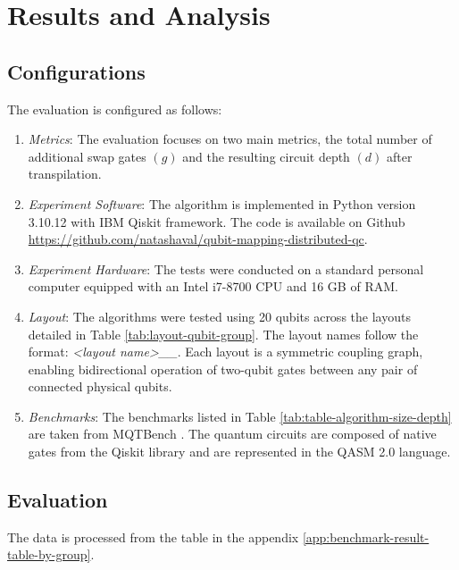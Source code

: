 \chapter{Results and Analysis} \label{Chap4}
\section{Configurations} %
The evaluation is configured as follows:
\begin{enumerate}[nolistsep]
    \item \textit{Metrics}: The evaluation focuses on two main metrics, the total number of additional swap gates $(g)$ and the resulting circuit depth $(d)$ after transpilation.
    \item \textit{Experiment Software}: The algorithm is implemented in Python version 3.10.12 with IBM Qiskit framework. The code is available on Github \url{https://github.com/natashaval/qubit-mapping-distributed-qc}.
    \item \textit{Experiment Hardware}: The tests were conducted on a standard personal computer equipped with an Intel i7-8700 CPU and 16 GB of RAM.
    \item \textit{Layout}: The algorithms were tested using 20 qubits across the layouts detailed in Table  \ref{tab:layout-qubit-group}. The layout names follow the format: \textit{<layout name>\_<number of qubits>\_<number of group>}. Each layout is a symmetric coupling graph, enabling bidirectional operation of two-qubit gates between any pair of connected physical qubits.
        
    \item \textit{Benchmarks}: The benchmarks  listed in Table \ref{tab:table-algorithm-size-depth} are taken from MQTBench \cite{quetschlich_mqt_2023}. The quantum circuits are composed of native gates from the Qiskit library and are represented in the QASM 2.0 language.
        
\end{enumerate}

\section{Evaluation}
The data is processed from the table in the appendix \ref{app:benchmark-result-table-by-group}.
